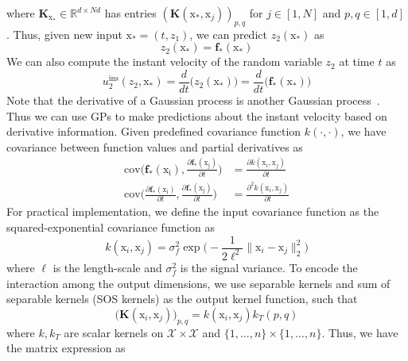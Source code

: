 \documentclass{article}
\begin{document}
where $\mathbf{K}_{\mathrm{x}_*} \in \mathbb{R}^{d \times Nd}$ has entries $(\mathbf{K}(\mathrm{x}_{*}, \mathrm{x}_{j}))_{p,q}$ for $j \in [1,N]$ and $p,q \in [1, d]$. Thus, given new input $\mathrm{x}_{*} = (t, z_1)$, we can predict $z_2(\mathrm{x}_{*})$ as 
\begin{equation}
    z_2 (\mathrm{x}_*) = \mathbf{f}_{*} (\mathrm{x}_{*}) \label{eq:infer_z}
\end{equation}
We can also compute the instant velocity of the random variable $z_2$ at time $t$ as 
\begin{equation}
    u^{\text{ins}}_2 (z_2, \mathrm{x}_{*}) = \frac{d}{dt} \Big(  z_2(\mathrm{x}_{*}) \Big) = \frac{d}{dt} \Big(  \mathbf{f}_{*}(\mathrm{x}_{*}) \Big) \label{eq:infer_velocity}
\end{equation}
Note that the derivative of a Gaussian process is another Gaussian process~\cite{Rasmussen2006Gaussian}. Thus we can use GPs to make predictions about the instant velocity based on derivative information. Given predefined covariance function $k(\cdot , \cdot)$, we have covariance between function values and
partial derivatives as
\begin{align}
    \text{cov}\Big(\mathbf{f}_*(\mathrm{x_i}), \frac{\partial \mathbf{f}_*(\mathrm{x_j})}{\partial t}\Big) &= \frac{\partial k(\mathrm{x}_i, \mathrm{x}_j)}{\partial t}  \\ \nonumber
    \text{cov}\Big(\frac{ \partial \mathbf{f}_*(\mathrm{x_i})}{ \partial t}, \frac{\partial \mathbf{f}_*(\mathrm{x_j})}{\partial t}\Big) &= \frac{\partial^2 k(\mathrm{x}_i, \mathrm{x}_j)}{\partial t}
\end{align}
For practical implementation, we define the input covariance function as the squared-exponential covariance function as 
\begin{equation}
    k(\mathrm{x}_i, \mathrm{x}_j) = \sigma^2_{f} \exp\Big( - \frac{1}{2 \ell^2} \| \mathrm{x}_i - \mathrm{x}_j\|^2_2\Big)
\end{equation}
where $\ell$ is the length-scale and $\sigma^2_f$ is the signal variance. To encode the interaction among the output dimensions, we use separable kernels and sum of separable kernels (SOS kernels) \citep{alvarez2012kernelsvectorvaluedfunctionsreview} as the output kernel function, such that 
\begin{equation}
    \big(\mathbf{K}(\mathrm{x}_i, \mathrm{x}_j) \big)_{p,q} = k(\mathrm{x}_i, \mathrm{x}_j) k_{T}(p,q)
\end{equation}
where $k, k_T$ are scalar kernels on $\mathcal{X} \times \mathcal{X}$ and $\{1,...,n\} \times \{1,..., n \}$. Thus, we have the matrix expression as 
\end{document}
